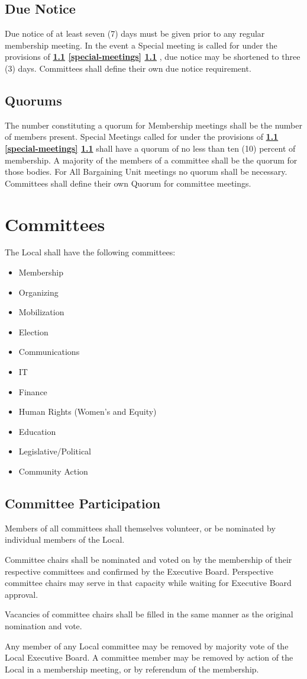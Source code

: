 \documentclass[11pt]{article}
\newcommand{\article}[1]{\vspace{.50cm}\section{#1}}
\newcommand{\articlesection}[1]{\vspace{.25cm}\subsection{#1}}
\newcommand{\fullref}[3]{%
  \textbf{%
    \ifthenelse{\isempty{#1}}%
    {}%
    {\ref{#1}}%
    \ifthenelse{\isempty{#2}}%
    {}%
    {%
      \ifthenelse{\isempty{#1}}{}{, }%
      \ref{#2}%
    }%
    \ifthenelse{\isempty{#3}}%
    {}%
    {\ref{#3}}%
  }%
}
\begin{document}
\articlesection{Due Notice}
Due notice of at least seven (7) days must be given prior to any regular membership meeting. In the event a Special meeting is called for under the provisions of \fullref{}{special-meetings}{}, due notice may be shortened to three (3) days. Committees shall define their own due notice requirement.

\articlesection{Quorums}
The number constituting a quorum for Membership meetings shall be the number of members present. Special Meetings called for under the provisions of \fullref{}{special-meetings}{} shall have a quorum of no less than ten (10) percent of membership. A majority of the members of a committee shall be the quorum for those bodies. For All Bargaining Unit meetings no quorum shall be necessary. Committees shall define their own Quorum for committee meetings.

\article{Committees}\label{committees}
The Local shall have the following committees:
\begin{itemize}
\item Membership
\item Organizing
\item Mobilization
\item Election
\item Communications
\item IT
\item Finance
\item Human Rights (Women’s and Equity)
\item Education
\item Legislative/Political
\item Community Action
\end{itemize}

\articlesection{Committee Participation}
\begin{paralist}
\item Members of all committees shall themselves volunteer, or be nominated by individual members of the Local.
\item Committee chairs shall be nominated and voted on by the membership of their respective committees and confirmed by the Executive Board. Perspective committee chairs may serve in that capacity while waiting for Executive Board approval.
\item Vacancies of committee chairs shall be filled in the same manner as the original nomination and vote.
  \item Any member of any Local committee may be removed by majority vote of the Local Executive Board. A committee member may be removed by action of the Local in a membership meeting, or by referendum of the membership.
\end{paralist}
\end{document}

